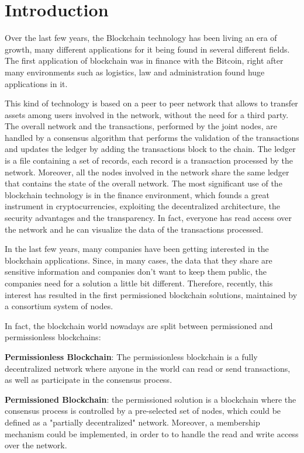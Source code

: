 \chapter{Introduction}

Over the last few years, the Blockchain technology has been living an era of growth, many different applications for 
it being found in several different fields. The first application of blockchain was in finance with the Bitcoin, right
after many environments such as logistics, law and administration found huge applications in it. 
\bigskip

This kind of technology is based on a peer to peer network that allows to transfer assets among users involved in the 
network, without the need for a third party. The overall network and the transactions, performed by the joint nodes, 
are handled by a consensus algorithm that performs the validation of the transactions and updates the ledger by adding 
the transactions block to the chain. The ledger is a file containing a set of records, each record is a transaction 
processed by the network. Moreover, all the nodes involved in the network share the same ledger that contains the state 
of the overall network. The most significant use of the blockchain technology is in the finance environment, which founds 
a great instrument in cryptocurrencies, exploiting the decentralized architecture, the security advantages and the 
transparency. In fact, everyone has read access over the network and he can visualize the data of the transactions processed.
\bigskip

In the last few years, many companies have been getting interested in the blockchain applications. Since, in many cases, 
the data that they share are sensitive information and companies don't want to keep them public, the companies need for 
a solution a little bit different. Therefore, recently, this interest has resulted in the first permissioned blockchain 
solutions, maintained by a consortium system of nodes.
\bigskip

In fact, the blockchain world nowadays are split between permissioned and permissionless blockchains:
\begin{outline}
    \1 \textbf{Permissionless Blockchain}: The permissionless blockchain is a fully decentralized network where anyone in the world can read or send transactions, as well as participate in the consensus process.

    \1 \textbf{Permissioned Blockchain}: the permissioned solution is a blockchain where the consensus process is controlled by a 
    pre-selected set of nodes, which could be defined as a "partially decentralized" network. Moreover, a membership mechanism could 
    be implemented, in order to to handle the read and write access over the network. 
\end{outline}

